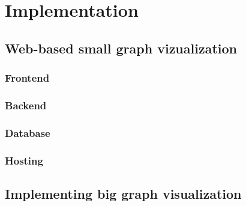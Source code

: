 \chapter{Implementation}

\section{Web-based small graph vizualization}

\subsection{Frontend}

\subsection{Backend}

\subsection{Database}

\subsection{Hosting}

\section{Implementing big graph visualization}

\subsection{}